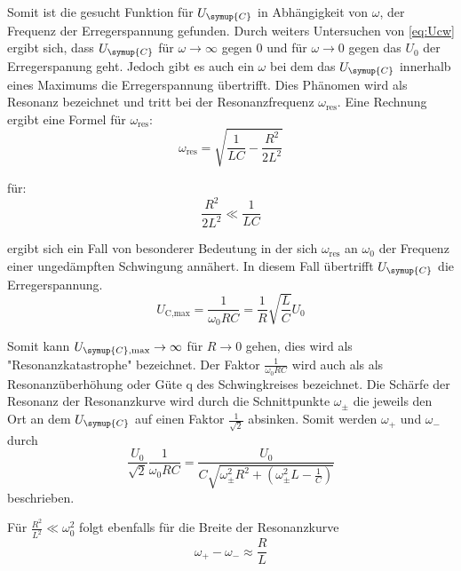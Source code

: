     Somit ist die gesucht Funktion für $U_{\symup{C}}$ in Abhängigkeit von $\omega$, der Frequenz der Erregerspannung gefunden. Durch 
    weiters Untersuchen von \ref{eq:Ucw} ergibt sich, dass $U_{\symup{C}}$ für $\omega \to \infty $ gegen 0 und für $\omega \to 0$ gegen 
    das $U_0$ der Erregerspanung geht. Jedoch gibt es auch ein $\omega$ bei dem das $U_{\symup{C}}$ innerhalb eines Maximums die 
    Erregerspannung übertrifft. Dies Phänomen wird als Resonanz bezeichnet und tritt bei der Resonanzfrequenz $\omega_{\text{res}}$. 
    Eine Rechnung ergibt eine Formel für $\omega_{\text{res}}$:
    \begin{equation}
        \omega_{\text{res}} = \sqrt{\frac{1}{LC}-\frac{R^2}{2L^2}} \nonumber
    \end{equation}

    für: 
    \begin{equation}
        \frac{R^2}{2L^2} \ll \frac{1}{LC} \nonumber
    \end{equation}

    ergibt sich ein Fall von besonderer Bedeutung in der sich $\omega_{\text{res}}$ an $\omega_0$ der Frequenz einer ungedämpften 
    Schwingung annähert. In diesem Fall übertrifft $U_{\symup{C}}$ die Erregerspannung.
    \begin{equation}
        U_{\text{C,max}} = \frac{1}{\omega_0 RC} = \frac{1}{R} \sqrt{\frac{L}{C}} U_0 \nonumber
    \end{equation}

    Somit kann $U_{\symup{C},\text{max}} \to \infty$ für $R \to 0$ gehen, dies wird als "Resonanzkatastrophe" bezeichnet. Der Faktor
    $\frac{1}{\omega_0 RC}$ wird auch als als Resonanzüberhöhung oder Güte q des Schwingkreises bezeichnet. Die Schärfe der Resonanz 
    der Resonanzkurve wird durch die Schnittpunkte $\omega_{\pm}$ die jeweils den Ort an dem $U_{\symup{C}}$ auf einen Faktor $\frac{1}{\sqrt{2}}$ 
    absinken. Somit werden $\omega_+$ und $\omega_-$ durch 
    \begin{equation}
        \frac{U_0}{\sqrt{2}} \frac{1}{\omega_0 RC} = \frac{U_0}{C \sqrt{\omega^2_{\pm} R^2 + \left( \omega^2_{\pm}L - \frac{1}{C} \right) }} \nonumber
    \end{equation}
    beschrieben.

    Für $\frac{R^2}{L^2} \ll {\omega}^2_0$ folgt ebenfalls für die Breite der Resonanzkurve
    \begin{equation}
        \omega_+ - \omega_- \approx \frac{R}{L} 
        \label{eq:v1}
    \end{equation}

